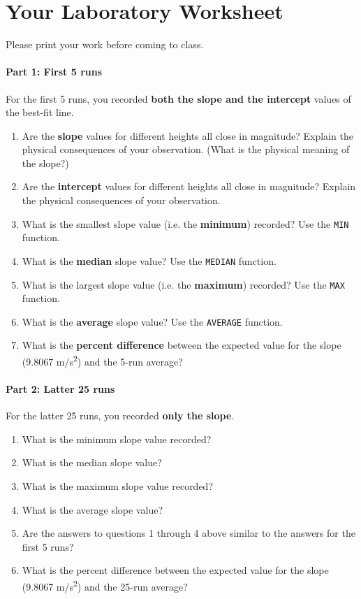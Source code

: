 \section{Your Laboratory Worksheet}
%
Please print your work before coming to class.
%
\paragraph{Part 1: First 5 runs}
%
For the first 5 runs, you recorded \textbf{both the slope and the intercept} values of the best-fit line.
\begin{enumerate}
    \item Are the \textbf{slope} values for different heights all close in magnitude? Explain the physical consequences of your observation. (What is the physical meaning of the slope?)
    \item Are the \textbf{intercept} values for different heights all close in magnitude? Explain the physical consequences of your observation.
    \item What is the smallest slope value (i.e. the \textbf{minimum}) recorded? Use the \texttt{MIN} function.
    \item What is the \textbf{median} slope value? Use the \texttt{MEDIAN} function.
    \item What is the largest slope value (i.e. the \textbf{maximum}) recorded? Use the \texttt{MAX} function.
    \item What is the \textbf{average} slope value? Use the \texttt{AVERAGE} function.
    \item What is the \textbf{percent difference} between the expected value for the slope (9.8067 m/s\textsuperscript{2}) and the 5-run average?
\end{enumerate}
%
\paragraph{Part 2: Latter 25 runs}
%
For the latter 25 runs, you recorded \textbf{only the slope}.
\begin{enumerate}
    \item What is the minimum slope value recorded?
    \item What is the median slope value?
    \item What is the maximum slope value recorded?
    \item What is the average slope value?
    \item Are the answers to questions 1 through 4 above similar to the answers for the first 5 runs?
    \item What is the percent difference between the expected value for the slope (9.8067 m/s\textsuperscript{2}) and the 25-run average?
\end{enumerate}
%
